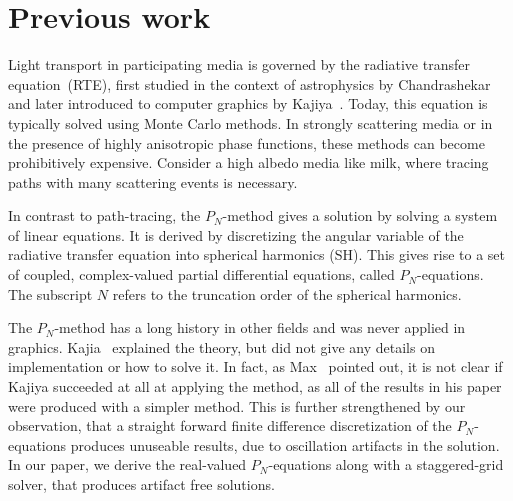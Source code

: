 \section{Previous work}

Light transport in participating media is governed by the radiative transfer equation~(RTE), first studied in the context of astrophysics by Chandrashekar~\cite{Chandrasekhar60} and later introduced to computer graphics by Kajiya~\cite{Kajiya86}. Today, this equation is typically solved using Monte Carlo methods. In strongly scattering media or in the presence of highly anisotropic phase functions, these methods can become prohibitively expensive. Consider a high albedo media like milk, where tracing paths with many scattering events is necessary.

In contrast to path-tracing, the $P_N$-method gives a solution by solving a system of linear equations. It is derived by discretizing the angular variable of the radiative transfer equation into spherical harmonics (SH). This gives rise to a set of coupled, complex-valued partial differential equations, called $P_N$-equations. The subscript $N$ refers to the truncation order of the spherical harmonics.

The $P_N$-method has a long history in other fields and was never applied in graphics. Kajia~\cite{Kajiya84} explained the theory, but did not give any details on implementation or how to solve it. In fact, as Max~\cite{Max95} pointed out, it is not clear if Kajiya succeeded at all at applying the method, as all of the results in his paper were produced with a simpler method. This is further strengthened by our observation, that a straight forward finite difference discretization of the $P_N$-equations produces unuseable results, due to oscillation artifacts in the solution. In our paper, we derive the real-valued $P_N$-equations along with a staggered-grid solver, that produces artifact free solutions.

